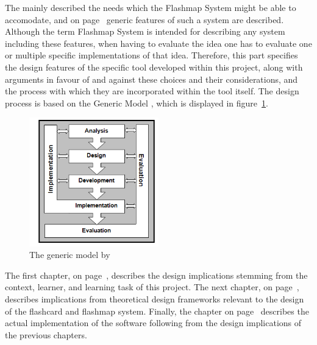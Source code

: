 The  mainly described the needs which the Flashmap System might be able to accomodate, and on page~\pageref{sec:intro_flashmap} generic features of such a system are described. Although the term Flashmap System is intended for describing any system including these features, when having to evaluate the idea one has to evaluate one or multiple specific implementations of that idea. Therefore, this part specifies the design features of the specific tool developed within this project, along with arguments in favour of and against these choices and their considerations, and the process with which they are incorporated within the tool itself. The design process is based on the Generic Model \cite{genericmodel}, which is displayed in figure~\ref{fig:genericmodel}.

\begin{figure}[h]
    \centering
    \includegraphics[width=0.5\textwidth]{img/genericmodel}
    \caption{The generic model by \protect{}\label{fig:genericmodel}}
\end{figure}

The first chapter,  on page~\pageref{ch:analysis}, describes the design implications stemming from the context, learner, and learning task of this project. The next chapter,  on page~\pageref{ch:frameworks}, describes implications from theoretical design frameworks relevant to the design of the flashcard and flashmap system. Finally, the  chapter on page~\pageref{ch:software} describes the actual implementation of the software following from the design implications of the previous chapters.
